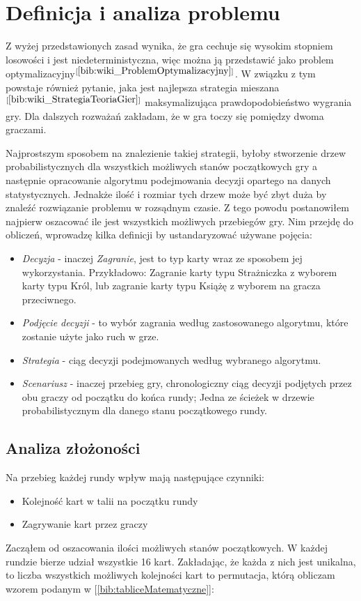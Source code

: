 \section{Definicja i analiza problemu}
\label{sec:opisProblemu}
Z wyżej przedstawionych zasad wynika, że gra cechuje się wysokim stopniem losowości i jest niedeterministyczna, więc można ją przedstawić jako problem optymalizacyjny$^{[\ref{bib:wiki_ProblemOptymalizacyjny}]}$. W związku z tym powstaje również pytanie, jaka jest najlepsza strategia mieszana$^{[\ref{bib:wiki_StrategiaTeoriaGier}]}$ maksymalizująca prawdopodobieństwo wygrania gry. Dla dalszych rozważań zakładam, że w gra toczy się pomiędzy dwoma graczami.

Najprostszym sposobem na znalezienie takiej strategii, byłoby stworzenie drzew probabilistycznych dla wszystkich możliwych stanów początkowych gry a następnie opracowanie algorytmu podejmowania decyzji opartego na danych statystycznych. Jednakże ilość i rozmiar tych drzew może być zbyt duża by znaleźć rozwiązanie problemu w rozsądnym czasie. Z tego powodu postanowiłem najpierw oszacować ile jest wszystkich możliwych przebiegów gry. Nim przejdę do obliczeń, wprowadzę kilka definicji by ustandaryzować używane pojęcia:
\begin{itemize}
	\item \textit{Decyzja} - inaczej \textit{Zagranie}, jest to typ karty wraz ze sposobem jej wykorzystania. Przykładowo: Zagranie karty typu Strażniczka z wyborem karty typu Król, lub zagranie karty typu Książę z wyborem na gracza przeciwnego.
	\item \textit{Podjęcie decyzji} - to wybór zagrania według zastosowanego algorytmu, które zostanie użyte jako ruch w grze.
	\item \textit{Strategia} - ciąg decyzji podejmowanych według wybranego algorytmu. 
	\item \textit{Scenariusz} - inaczej przebieg gry, chronologiczny ciąg decyzji podjętych przez obu graczy od początku do końca rundy; Jedna ze ścieżek w drzewie probabilistycznym dla danego stanu początkowego rundy.
\end{itemize}

\subsection*{Analiza złożoności}
Na przebieg każdej rundy wpływ mają następujące czynniki:
\begin{itemize}
	\item Kolejność kart w talii na początku rundy
	\item Zagrywanie kart przez graczy
\end{itemize}
Zacząłem od oszacowania ilości możliwych stanów początkowych. W każdej rundzie bierze udział wszystkie 16 kart. Zakładając, że każda z nich jest unikalna, to  liczba wszystkich możliwych kolejności kart to permutacja, którą obliczam wzorem podanym w [\ref{bib:tabliceMatematyczne}]:

